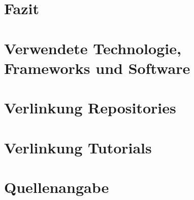 \documentclass{scrartcl}
\begin{document}
\newpage

\section{Fazit}


\newpage

\section{Verwendete Technologie, Frameworks und Software}


\newpage

\section{Verlinkung Repositories}


\newpage

\section{Verlinkung Tutorials}


\newpage

\section{Quellenangabe}
\end{document}
